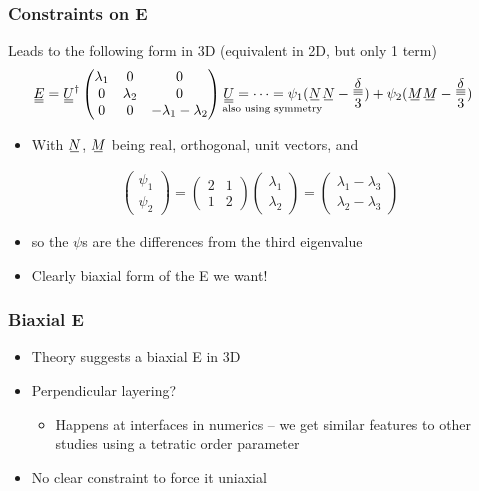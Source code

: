 \documentclass[10pt,mathserif]{beamer}
\begin{document}
\begin{frame}
    \frametitle{Constraints on E}
    Leads to the following form in 3D \color{gray} (equivalent in 2D, but only 1 term) \normalcolor
    \begin{align*}
        \du{E} &= \du{U}^\dagger \begin{pmatrix}
            \lambda_1 & 0 & 0 \\
            0 & \lambda_2 & 0 \\
            0 & 0 & - \lambda_1 - \lambda_2
        \end{pmatrix} \underset{\text{also using symmetry}}{\du{U} = \cdots = \psi_1(\su{N}}\su{N} - \frac{\du{\delta}}{3}) + \psi_2(\su{M}\su{M} - \frac{\du{\delta}}{3})
    \end{align*}
    \begin{itemize}
        \item With $\su{N}$, $\su{M}$ being real, orthogonal, unit vectors, and
    \end{itemize}
    \begin{align*}
        \begin{pmatrix} \psi_1 \\ \psi_2 \end{pmatrix} = \begin{pmatrix} 2 & 1 \\ 1 & 2 \end{pmatrix} \begin{pmatrix} \lambda_1 \\ \lambda_2 \end{pmatrix} = \begin{pmatrix} \lambda_1 - \lambda_3 \\ \lambda_2 - \lambda_3 \end{pmatrix}
    \end{align*}
    \begin{itemize}
        \item \color{gray} so the $\psi$s are the differences from the third eigenvalue\normalcolor
        \item Clearly biaxial form of the E we want!
    \end{itemize}
\end{frame}

\begin{frame}
    \frametitle{Biaxial E}
    \begin{itemize}
        \item Theory suggests a biaxial E in 3D
        \item Perpendicular layering?
        \begin{itemize}
            \item Happens at interfaces in numerics -- we get similar features to other studies using a tetratic order parameter
        \end{itemize}
        \item No clear constraint to force it uniaxial
    \end{itemize}
\end{frame}
\end{document}
